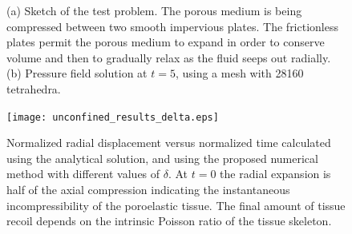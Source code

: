 \begin{figure}[h]
  \centering
  \label{fig:animals}
\caption{ (a) Sketch of the test problem. The porous medium is being compressed between two smooth impervious plates. The frictionless plates permit the porous medium to expand in order to conserve volume and then to gradually relax as the fluid seeps out radially. (b) Pressure field solution at $t=5$, using a mesh with 28160 tetrahedra.}
\end{figure}
 \begin{figure}[h]
\begin{center}
\texttt{[image: unconfined\_results\_delta.eps]}
\caption{Normalized radial displacement versus normalized time calculated using the analytical
solution, and using the proposed numerical method with different values of $\delta$. At $t=0$ the radial expansion is half of the axial compression indicating the instantaneous incompressibility of the poroelastic tissue. The final amount of tissue recoil depends on the intrinsic Poisson ratio of the tissue skeleton.}
\label{fig:anal_unconfined_plot}
\end{center}
\end{figure}
